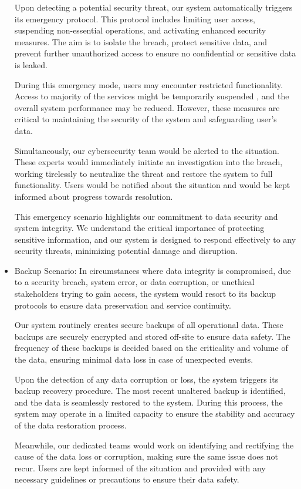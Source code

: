 \begin{itemize}
Upon detecting a potential security threat, our system automatically triggers its emergency protocol. This protocol includes limiting user access, suspending non-essential operations, and activating enhanced security measures. The aim is to isolate the breach, protect sensitive data, and prevent further unauthorized access to ensure no confidential or sensitive data is leaked.

During this emergency mode, users may encounter restricted functionality. Access to majority of the services might be temporarily suspended , and the overall system performance may be reduced. However, these measures are critical to maintaining the security of the system and safeguarding user's data.

Simultaneously, our cybersecurity team would be alerted to the situation. These experts would immediately initiate an investigation into the breach, working tirelessly to neutralize the threat and restore the system to full functionality. Users would be notified about the situation and would be kept informed about progress towards resolution.

This emergency scenario highlights our commitment to data security and system integrity. We understand the critical importance of protecting sensitive information, and our system is designed to respond effectively to any security threats, minimizing potential damage and disruption.

    \item Backup Scenario: In circumstances where data integrity is compromised, due to a security breach, system error, or data corruption, or unethical stakeholders trying to  gain access, the system would resort to its backup protocols to ensure data preservation and service continuity.

Our system routinely creates secure backups of all operational data. These backups are securely encrypted and stored off-site to ensure data safety. The frequency of these backups is decided based on the criticality and volume of the data, ensuring minimal data loss in case of unexpected events.

Upon the detection of any data corruption or loss, the system triggers its backup recovery procedure. The most recent unaltered backup is identified, and the data is seamlessly restored to the system. During this process, the system may operate in a limited capacity to ensure the stability and accuracy of the data restoration process.

Meanwhile, our dedicated teams would work on identifying and rectifying the cause of the data loss or corruption, making sure the same issue does not recur. Users are kept informed of the situation and provided with any necessary guidelines or precautions to ensure their data safety.


\end{itemize}
